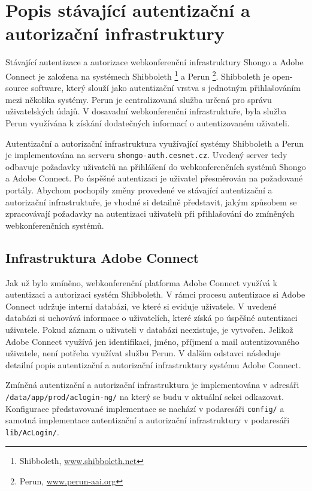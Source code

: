 \documentclass[
  printed, %
  twoside, %
  table,   %
  nolof,     %
  nolot,     %
]{fithesis3}
\begin{document}
\section{Popis stávající autentizační a autorizační infrastruktury}
Stávající autentizace a autorizace webkonferenční infrastruktury Shongo a Adobe Connect je založena na systémech Shibboleth \footnote{Shibboleth, \url{www.shibboleth.net}} a Perun \footnote{Perun, \url{www.perun-aai.org}}. Shibboleth je open-source software, který slouží jako autentizační vrstva s jednotným přihlašováním mezi několika systémy. Perun je centralizovaná služba určená pro správu uživatelských údajů. V dosavadní webkonferenční infrastruktuře, byla služba Perun využívána k získání dodatečných informací o autentizovaném uživateli. \par

Autentizační a autorizační infrastruktura využívající systémy Shibboleth a Perun je implementována na serveru \texttt{shongo-auth.cesnet.cz}. Uvedený server tedy odbavuje požadavky uživatelů na přihlášení do webkonferenčních systémů Shongo a Adobe Connect. Po úspěšné autentizaci je uživatel přesměrován na požadované portály. Abychom pochopily změny provedené ve stávající autentizační a autorizační infrastruktuře, je vhodné si detailně představit, jakým způsobem se zpracovávají požadavky na autentizaci uživatelů při přihlašování do zmíněných webkonferenčních systémů.  

\subsection{Infrastruktura Adobe Connect}
Jak už bylo zmíněno, webkonferenční platforma Adobe Connect využívá k autentizaci a
autorizaci systém Shibboleth. V rámci procesu autentizace si Adobe Connect udržuje interní databázi, ve které si eviduje uživatele. V
uvedené databázi si uchovává informace o uživatelích,
které získá po úspěšné autentizaci uživatele. Pokud záznam o uživateli
v databázi neexistuje, je vytvořen. Jelikož Adobe Connect využívá jen
identifikaci, jméno, příjmení a mail autentizovaného uživatele, není
potřeba využívat službu Perun. V dalším odstavci následuje detailní popis autentizační a autorizační infrastruktury systému Adobe Connect. \par

Zmíněná autentizační a autorizační infrastruktura je implementována v adresáři \texttt{/data/app/prod/aclogin-ng/} na který se budu v aktuální sekci odkazovat. Konfigurace představované implementace se nachází v podaresáři \texttt{config/} a samotná implementace autentizační a autorizační infrastruktury v podaresáři \texttt{lib/AcLogin/}. \par
\end{document}
